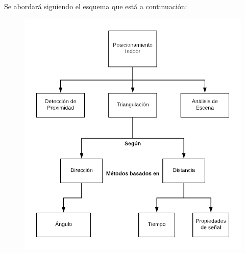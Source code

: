 Se abordará siguiendo el esquema que está a continuación:
\begin{figure}[h!]
    \centering
    \includegraphics[scale = 0.3]{./images/diagrama}
    \label{fig:diagrama}
\end{figure}




